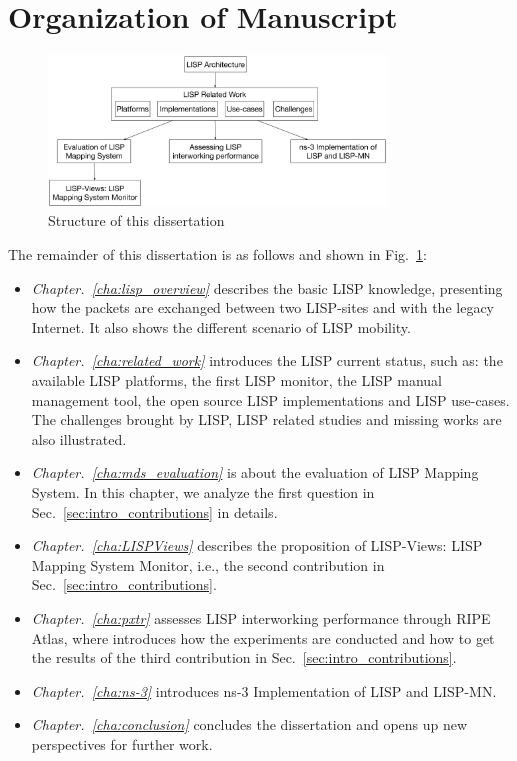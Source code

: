 \section{Organization of Manuscript}
\label{sec:intro_structure}
\begin{figure}[t]
	\centering
	\includegraphics[width=0.8\textwidth]{Pics/structure_thesis.eps}
	\caption{Structure of this dissertation}
	\label{structure_thesis}
\end{figure}
The remainder of this dissertation is as follows and shown in Fig.~\ref{structure_thesis}:
\begin{itemize}[noitemsep,topsep=0pt]
	\item \emph{Chapter.~\ref{cha:lisp_overview}} describes the basic LISP knowledge, presenting how the packets are exchanged between two LISP-sites and with the legacy Internet. It also shows the different scenario of LISP mobility.
	\item \emph{Chapter.~\ref{cha:related_work}} introduces the LISP current status, such as: the available LISP platforms, the first LISP monitor, the LISP manual management tool, the open source LISP implementations and LISP use-cases. The challenges brought by LISP, LISP related studies and missing works are also illustrated.
    \item \emph{Chapter.~\ref{cha:mds_evaluation}} is about the evaluation of LISP Mapping System. In this chapter, we analyze the first question in Sec.~\ref{sec:intro_contributions} in details.
    \item \emph{Chapter.~\ref{cha:LISPViews}} describes the proposition of LISP-Views: LISP Mapping System Monitor, i.e., the second contribution in Sec.~\ref{sec:intro_contributions}.
    \item \emph{Chapter.~\ref{cha:pxtr}} assesses LISP interworking performance through RIPE Atlas, where introduces how the experiments are conducted and how to get the results of the third contribution in Sec.~\ref{sec:intro_contributions}.
    \item \emph{Chapter.~\ref{cha:ns-3}} introduces ns-3 Implementation of LISP and LISP-MN.
    \item \emph{Chapter.~\ref{cha:conclusion}} concludes the dissertation and opens up new perspectives for further work.
\end{itemize}